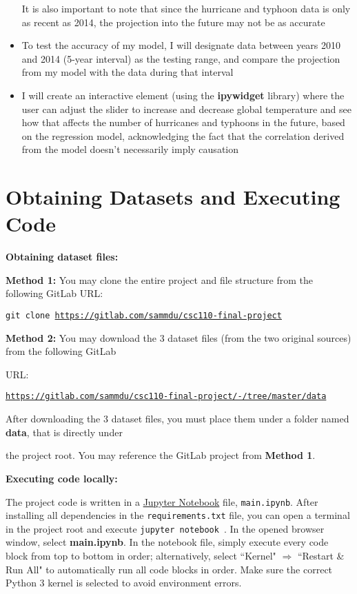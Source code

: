\documentclass[fontsize=11pt]{article}
\begin{document}
\begin{itemize}
    It is also important to note that since the hurricane and typhoon data is only as recent as 2014, the projection into the future may not be as accurate

    \item To test the accuracy of my model, I will designate data between years 2010 and 2014 (5-year interval) as the testing range, and compare the projection from my model with the data during that interval

    \item I will create an interactive element (using the \textbf{ipywidget} library) where the user can adjust the slider to increase and decrease global temperature and see how that affects the number of hurricanes and typhoons in the future, based on the regression model, acknowledging the fact that the correlation derived from the model doesn't necessarily imply causation
\end{itemize}

\section*{Obtaining Datasets and Executing Code}

\textbf{Obtaining dataset files:}

\medskip

\textbf{Method 1:} You may clone the entire project and file structure from the following GitLab URL:

\qquad \texttt{git clone \url{https://gitlab.com/sammdu/csc110-final-project}}

\medskip

\textbf{Method 2:} You may download the 3 dataset files (from the two original sources) from the following GitLab

URL:

\qquad \texttt{\url{https://gitlab.com/sammdu/csc110-final-project/-/tree/master/data}}

After downloading the 3 dataset files, you must place them under a folder named \textbf{data}, that is directly under

the project root. You may reference the GitLab project from \textbf{Method 1}.

\bigskip

\noindent \textbf{Executing code locally:}

\medskip

The project code is written in a \href{https://jupyter.readthedocs.io/en/latest/running.html}{Jupyter Notebook} file, \texttt{main.ipynb}. After installing all dependencies in the \texttt{requirements.txt} file, you can open a terminal in the project root and execute \texttt{jupyter notebook
}. In the opened browser window, select \textbf{main.ipynb}. In the notebook file, simply execute every code block from top to bottom in order; alternatively, select ``Kernel" $\Rightarrow$ ``Restart \& Run All" to automatically run all code blocks in order. Make sure the correct Python 3 kernel is selected to avoid environment errors.
\end{document}
